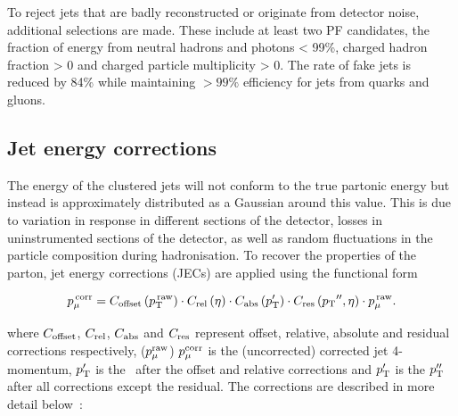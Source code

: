 To reject jets that are badly reconstructed or originate from detector noise, additional selections are made. These include at least
two PF candidates, the fraction of energy from neutral hadrons and photons < 99\%,  charged hadron fraction > 0 and charged particle multiplicity > 0.
The rate of fake jets is reduced by 84\% while maintaining $> 99\%$ efficiency for jets from quarks and gluons.

\subsection{Jet energy corrections}
\label{sec:jec}
The energy of the clustered jets will not conform to the true partonic energy but instead is approximately distributed as a Gaussian around this value.
This is due to variation in response in different sections of the detector, losses in uninstrumented sections of the detector, as well as 
random fluctuations in the particle composition during hadronisation. To recover the properties of the parton, jet energy corrections 
(JECs) are applied using the functional form~\cite{jec}

\begin{equation}
\label{equ:jec}
  p_{\mu}^{\,\rm{corr}}=C_{\rm{offset}}\left(p_{\text{T}}^{\,\rm{raw}}\right)\cdot
  C_{\rm{rel}}\left(\eta\right)\cdot C_{\rm{abs}}\left(p_{\rm{T}}'\right)\cdot
  C_{\rm{res}}\left({p_{\text T}}'',\eta\right)\cdot p_{\mu}^{\,\rm{raw}}.
\end{equation}

where $C_{\rm{offset}}$, $C_{\rm{rel}}$, $C_{\rm{abs}}$ and $C_{\rm{res}}$ represent offset,
relative, absolute and residual corrections respectively, 
 ($p_{\mu}^{\rm{raw}}$) $p_{\mu}^{\rm{corr}}$ is the (uncorrected) corrected jet 4-momentum, $p'_{\rm{T}}$ is the \pt~after the 
 offset and relative corrections and  $p'_{\rm{T}}$ is the $p''_{\rm{T}}$ after
all corrections except the residual. The corrections are described in more detail below~\cite{jec2}:


